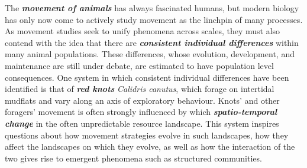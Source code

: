\documentclass[]{scrartcl}
\begin{document}
The \emph{\textbf{movement of animals}} has always fascinated humans,
but modern biology has only now come to actively study movement as the
linchpin of many processes. As movement studies seek to unify phenomena \cite{Rees_2002}
across scales, they must also contend with the idea that there are
\emph{\textbf{consistent individual differences}} within many animal
populations. These differences, whose evolution, development, and
maintenance are still under debate, are estimated to have population
level consequences. One system in which consistent individual
differences have been identified is that of \emph{\textbf{red knots}}
\emph{Calidris canutus}, which forage on intertidal mudflats and vary
along an axis of exploratory behaviour. Knots' and other foragers'
movement is often strongly influenced by which
\emph{\textbf{spatio-temporal change}} in the often unpredictable
resource landscape. This system inspires questions about how movement
strategies evolve in such landscapes, how they affect the landscapes on
which they evolve, as well as how the interaction of the two gives rise
to emergent phenomena such as structured communities. 

\newpage
\end{document}
